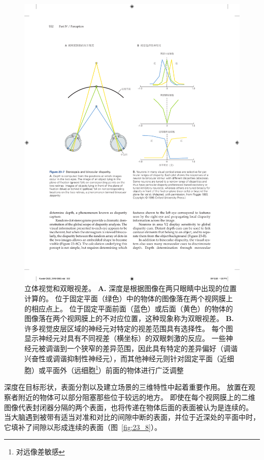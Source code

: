 \begin{figure}[htbp]
	\centering
	\includegraphics[width=1.0\linewidth]{chap23/fig_23_7}
	\caption{立体视觉和双眼视差。
		\textbf{A.} 深度是根据图像在两只眼睛中出现的位置计算的。
		位于固定平面（绿色）中的物体的图像落在两个视网膜上的相应点上。
		位于固定平面前面（蓝色）或后面（黄色）的物体的图像落在两个视网膜上的不对应位置，这种现象称为双眼视差。
		\textbf{B.} 许多视觉皮层区域的神经元对特定的视差范围具有选择性。
		每个图显示神经元对具有不同视差（横坐标）的双眼刺激的反应。
		一些神经元被调谐到一个狭窄的差异范围，因此具有特定的差异偏好（调谐兴奋性或调谐抑制性神经元），而其他神经元则针对固定平面（近细胞）或平面外（远细胞\footnote{对远像差敏感}）前面的物体进行广泛调整\cite{poggio1995mechanisms}}
	\label{fig:23_7}
\end{figure}



深度在目标形状，表面分割以及建立场景的三维特性中起着重要作用。
放置在观察者附近的物体可以部分阻塞那些位于较远的地方。
即使在每个视网膜上的二维图像代表封闭器分隔的两个表面，也将传递在物体后面的表面被认为是连续的。
当大脑遇到被带有适当对准和对比的间隙中断的表面，并位于近深处的平面中时，它填补了间隙以形成连续的表面（图~\ref{fig:23_8}）。


